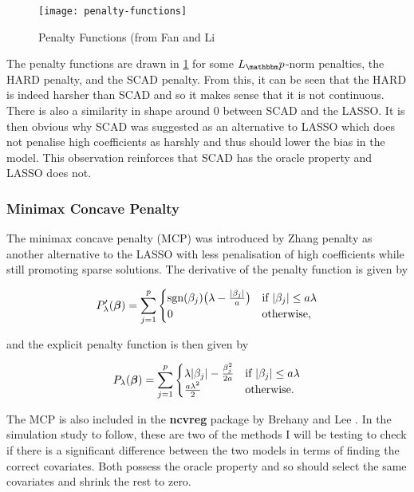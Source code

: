 \begin{figure}[ht!]
  \texttt{[image: penalty-functions]}
  \caption{Penalty Functions (from Fan and Li }
  \label{fig:penalty-functions}
\end{figure}

The penalty functions are drawn in \cref{fig:penalty-functions} for some $L_\p$-norm penalties, the HARD penalty, and the SCAD penalty. From this, it can be seen that the HARD is indeed harsher than SCAD and so it makes sense that it is not continuous. There is also a similarity in shape around 0 between SCAD and the LASSO. It is then obvious why SCAD was suggested as an alternative to LASSO which does not penalise high coefficients as harshly and thus should lower the bias in the model. This observation reinforces that SCAD has the oracle property and LASSO does not.

\subsubsection{Minimax Concave Penalty}

The minimax concave penalty (MCP) was introduced by Zhang  penalty as another alternative to the LASSO with less penalisation of high coefficients while still promoting sparse solutions. The derivative of the penalty function is given by

\begin{equation}
    P_\lambda'(\boldsymbol{\beta}) = \sum_{j=1}^p
    \begin{cases}
        \textrm{sgn}(\beta_j)\big(\lambda-\frac{|\beta_j|}{a}\big) &\textrm{if }|\beta_j|\leq a\lambda\\
        0 &\textrm{otherwise},
    \end{cases}
\end{equation}

and the explicit penalty function is then given by

\begin{equation}
    P_\lambda(\boldsymbol{\beta}) = \sum_{j=1}^p
    \begin{cases}
        \lambda|\beta_j| - \frac{\beta_j^2}{2a} &\textrm{if }|\beta_j|\leq a\lambda\\
        \frac{a\lambda^2}{2} &\textrm{otherwise}.
    \end{cases}
\end{equation}

The MCP is also included in the \textbf{ncvreg} package by Brehany and Lee . In the simulation study to follow, these are two of the methods I will be testing to check if there is a significant difference between the two models in terms of finding the correct covariates. Both possess the oracle property and so should select the same covariates and shrink the rest to zero.

